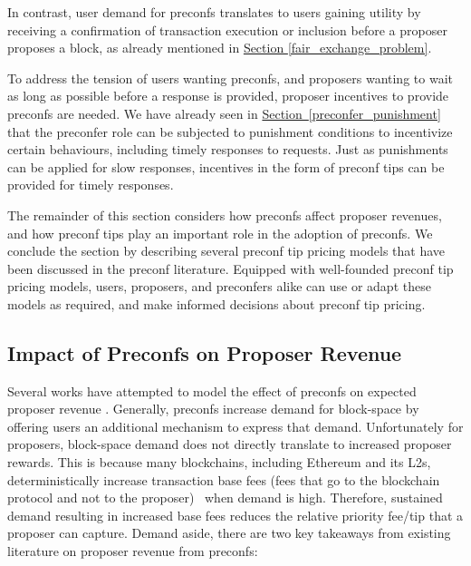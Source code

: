 \documentclass[a4paper]{article}
\theoremstyle{boldstyle}
\begin{document}
In contrast, user demand for preconfs translates to users gaining utility by receiving a confirmation of transaction execution or inclusion before a proposer proposes a block, as already mentioned in \hyperref[fair_exchange_problem]{Section \ref{fair_exchange_problem}}.

To address the tension of users wanting preconfs, and proposers wanting to wait as long as possible before a response is provided, proposer incentives to provide preconfs are needed. We have already seen in \hyperref[preconfer_punishment]{Section~\ref{preconfer_punishment}} that the preconfer role can be subjected to punishment conditions to incentivize certain behaviours, including timely responses to requests. Just as punishments can be applied for slow responses, incentives in the form of preconf tips can be provided for timely responses. 

The remainder of this section considers how preconfs affect proposer revenues, and how preconf tips play an important role in the adoption of preconfs. We conclude the section by describing several preconf tip pricing models that have been discussed in the preconf literature. Equipped with well-founded preconf tip pricing models, users, proposers, and preconfers alike can use or adapt these models as required, and make informed decisions about preconf tip pricing.


\subsection{Impact of Preconfs on Proposer Revenue}
\label{preconfs_impact_proposer_revenue}
    
     Several works have attempted to model the effect of preconfs on expected proposer revenue \cite{W:PreconfirmationsundertheNOlens,W:EstimatingtheRevenuefromIndependentSub-SlotAuctionPreconfirmations,W:AnalysingExpectedProposerRevenuefromPreconfirmations,W:APricingModelforInclusionPreconfirmations, W:MeasuringValidatorEconomics}. Generally, preconfs increase demand for block-space by offering users an additional mechanism to express that demand. Unfortunately for proposers, block-space demand does not directly translate to increased proposer rewards. This is because many blockchains, including Ethereum and its L2s, deterministically increase transaction base fees (fees that go to the blockchain protocol and not to the proposer)~\cite{EIP1559_Economic_Analysis} when demand is high. Therefore, sustained demand resulting in increased base fees reduces the relative priority fee/tip that a proposer can capture. Demand aside, there are two key takeaways from existing literature on proposer revenue from preconfs: 
        
\end{document}
